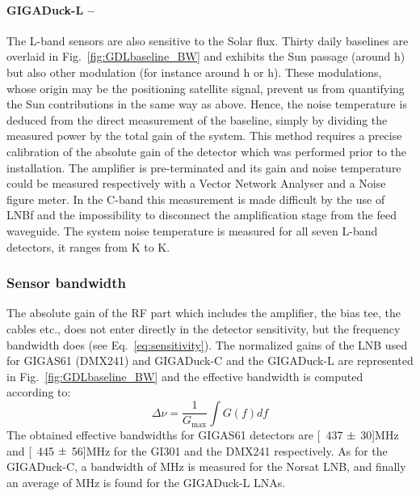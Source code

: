 \paragraph{GIGADuck-L --}
The L-band sensors are also sensitive to the Solar flux.  Thirty daily
baselines are  overlaid in Fig.~\ref{fig:GDLbaseline_BW}  and exhibits
the Sun  passage (around \unit[18]{h}) but also  other modulation (for
instance around \unit[0]{h}  or \unit[7]{h}). These modulations, whose
origin  may  be the  positioning  satellite  signal,  prevent us  from
quantifying the Sun contributions in the same way as above. Hence, the
noise  temperature  is deduced  from  the  direct  measurement of  the
baseline, simply by  dividing the measured power by  the total gain of
the system. This method requires a precise calibration of the absolute
gain   of   the   detector   which   was  performed   prior   to   the
installation. The  amplifier is pre-terminated and its  gain and noise
temperature  could  be measured  respectively  with  a Vector  Network
Analyser and a Noise figure  meter.  In the C-band this measurement is
made difficult by the use  of LNBf and the impossibility to disconnect
the  amplification stage  from the  feed waveguide.  The  system noise
temperature is measured for all seven L-band detectors, it ranges from
\unit[94]{K} to \unit[145]{K}.

\subsubsection{Sensor bandwidth}
The absolute  gain of  the RF part  which includes the  amplifier, the
bias tee,  the cables  etc., does not  enter directly in  the detector
sensitivity,    but     the    frequency    bandwidth     does    (see
Eq.~\eqref{eq:sensitivity}).  The normalized gains of the LNB used for
\mbox{GIGAS61} (DMX241) and \mbox{GIGADuck-C}  and the \mbox{GIGADuck-L} are represented in
Fig.~\ref{fig:GDLbaseline_BW} and the  effective bandwidth is computed
according to:
\begin{equation}
  \Delta \nu = \frac{1}{G_{\text{max}}} \int G(f) df
\end{equation}
The obtained effective bandwidths  for \mbox{GIGAS61} detectors are \unit[437
  $\rm \pm$  30]{MHz} and \unit[445  $\rm \pm$ 56]{MHz} for  the GI301
and the  DMX241 respectively.  As for the  \mbox{GIGADuck-C}, a  bandwidth of
\unit[750]{MHz} is measured for the Norsat LNB, and finally an average
of \unit[250]{MHz} is found for the \mbox{GIGADuck-L} LNAs.


